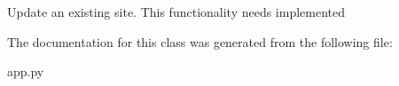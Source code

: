 \begin{DoxyVerb}Update an existing site. This functionality needs implemented
\end{DoxyVerb}
 

The documentation for this class was generated from the following file\+:\begin{DoxyCompactItemize}
\item 
app.\+py\end{DoxyCompactItemize}
